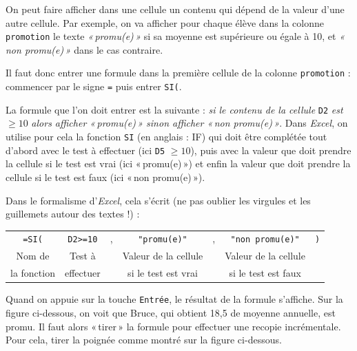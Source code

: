 On peut faire afficher dans une cellule un contenu qui dépend de la valeur d'une autre cellule. Par exemple, on va afficher pour chaque élève dans la colonne \texttt{promotion} le texte \emph{«\,promu(e)\,»} si sa moyenne est supérieure ou égale à 10, et \emph{«\,non promu(e)\,»} dans le cas contraire.

Il faut donc entrer une formule dans la première cellule de la colonne \texttt{promotion} : commencer par le signe \texttt{=} puis entrer \texttt{SI(}.


La formule que l'on doit entrer est la suivante : \textsl{si le contenu de la cellule} \texttt{D2} \textsl{est} $\geqslant 10$ \textsl{alors afficher «\,promu(e)\,» sinon afficher «\,non promu(e)\,»}. Dans \emph{Excel}, on utilise pour cela la fonction \texttt{SI} (en anglais : IF) qui doit être complétée tout d'abord avec le test à effectuer (ici \texttt{D5} $\geqslant 10$), puis avec la valeur que doit prendre la cellule si le test est vrai (ici «\,promu(e)\,») et enfin la valeur que doit prendre la cellule si le test est faux (ici «\,non promu(e)\,»).

\vspace{1em}

Dans le formalisme d'\emph{Excel}, cela s'écrit (ne pas oublier les virgules et les guillemets autour des textes !) :

\begin{center}
	\begin{tabular}{ccccccc}
		\texttt{=SI(} & \texttt{D2>=10} & , & \texttt{"promu(e)"} & , & \texttt{"non promu(e)"} & \texttt{)} \\ 
		Nom de & Test à  & & Valeur de la cellule & & Valeur de la cellule & \\
		la fonction & effectuer & &  si le test est vrai & & si le test est faux & \\  
	\end{tabular}
\end{center}


Quand on appuie sur la touche \texttt{Entrée}, le résultat de la formule s'affiche. Sur la figure ci-dessous, on voit que Bruce, qui obtient 18,5 de moyenne annuelle, est promu. Il faut alors «\,tirer\,» la formule pour effectuer une recopie incrémentale. Pour cela, tirer la poignée comme montré sur la figure ci-dessous.


